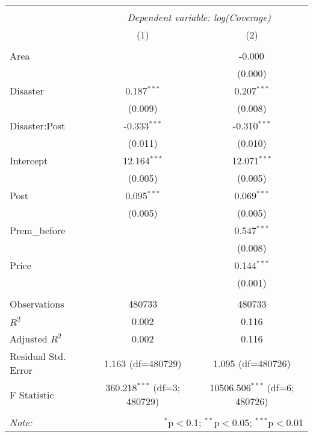 
\begin{tabular}{@{\extracolsep{5pt}}lcc}
\\[-1.8ex]\hline
\hline \\[-1.8ex]
& \multicolumn{2}{c}{\textit{Dependent variable: log(Coverage)}} \
\cr \cline{2-3}
\\[-1.8ex] & (1) & (2) \\
\hline \\[-1.8ex]
 Area & & -0.000$^{}$ \\
& & (0.000) \\
 Disaster & 0.187$^{***}$ & 0.207$^{***}$ \\
& (0.009) & (0.008) \\
 Disaster:Post & -0.333$^{***}$ & -0.310$^{***}$ \\
& (0.011) & (0.010) \\
 Intercept & 12.164$^{***}$ & 12.071$^{***}$ \\
& (0.005) & (0.005) \\
 Post & 0.095$^{***}$ & 0.069$^{***}$ \\
& (0.005) & (0.005) \\
 Prem\_before & & 0.547$^{***}$ \\
& & (0.008) \\
 Price & & 0.144$^{***}$ \\
& & (0.001) \\
\hline \\[-1.8ex]
 Observations & 480733 & 480733 \\
 $R^2$ & 0.002 & 0.116 \\
 Adjusted $R^2$ & 0.002 & 0.116 \\
 Residual Std. Error & 1.163 (df=480729) & 1.095 (df=480726) \\
 F Statistic & 360.218$^{***}$ (df=3; 480729) & 10506.506$^{***}$ (df=6; 480726) \\
\hline
\hline \\[-1.8ex]
\textit{Note:} & \multicolumn{2}{r}{$^{*}$p$<$0.1; $^{**}$p$<$0.05; $^{***}$p$<$0.01} \\
\end{tabular}
